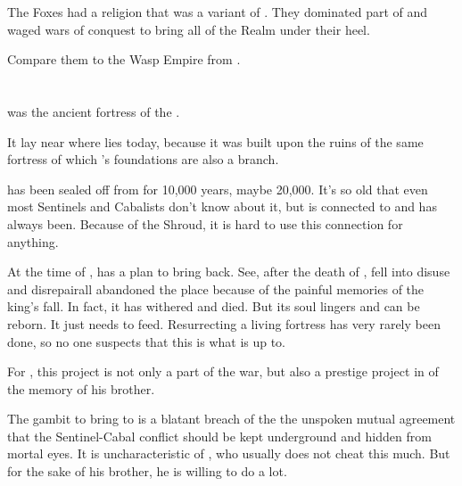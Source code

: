 The Foxes had a religion that was a variant of . 
They dominated part of \Neevrai and waged wars of conquest to bring all of the Realm under their heel. 

Compare them to the Wasp Empire from \cite{AdrianTchaikovsky:ShadowsoftheApt}. 
















\section{\Nithdornazsh}
\index{\Nithdornazsh}
\Nithdornazsh{} was the ancient \draconic{} fortress of the \dragonking{} \Nexagglachel. 

It lay near where \Malcur lies today, because it was built upon the ruins of the same  fortress of which \Malcur's foundations are also a branch. 

\Nithdornazsh{} has been sealed off from \Miith{} for 10,000 years, maybe 20,000. It's so old that even most Sentinels and Cabalists don't know about it, but \Malcur is connected to \Nithdornazsh{} and has always been. Because of the Shroud, it is hard to use this connection for anything. 

At the time of \TwilightAngelRememberEmph, \HriistD{} has a plan to bring \Nithdornazsh{} back. See, after the death of \Nexagglachel, \Nithdornazsh{} fell into disuse and disrepair\dash all \dragons{} abandoned the place because of the painful memories of the king's fall. In fact, it has withered and died. But its soul lingers and can be reborn. It just needs to feed. Resurrecting a living fortress has very rarely been done, so no one suspects that this is what \HriistD{} is up to. 

For \HriistD, this project is not only a part of the war, but also a prestige project in \honour of the memory of his brother. 

The gambit to bring \Nithdornazsh{} to \Miith{} is a blatant breach of the \charade\dash the unspoken mutual agreement that the Sentinel-Cabal conflict should be kept underground and hidden from mortal eyes. It is uncharacteristic of \HriistD{}, who usually does not cheat this much. But for the sake of his brother, he is willing to do a lot. 

